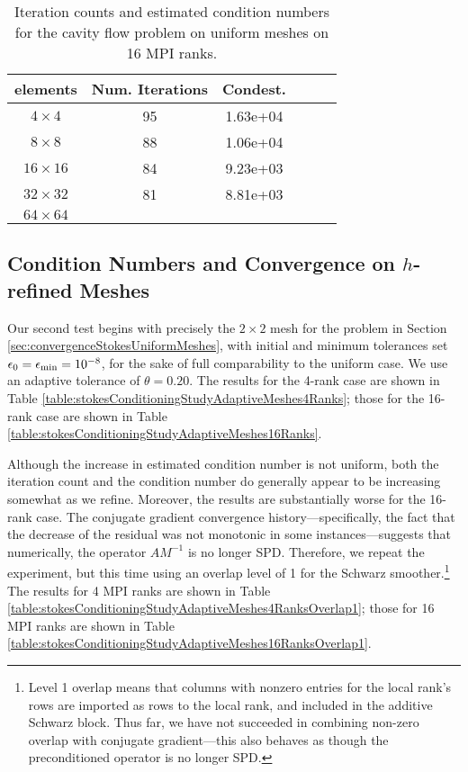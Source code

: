 \documentclass[11pt]{amsart}
\begin{document}
\begin{table}
\begin{tabular}{ c  c  c  c  c  c }
elements	&Num. Iterations	&Condest.\\
\hline
$4 \times 4$	&95	&1.63e+04\\
$8 \times 8$	&88	&1.06e+04\\
$16 \times 16$	&84	&9.23e+03\\
$32 \times 32$	&81	&8.81e+03\\
$64 \times 64$	&	&\\
\end{tabular}
\caption{Iteration counts and estimated condition numbers for the cavity flow problem on uniform meshes on 16 MPI ranks.}
\label{table:stokesConditioningStudyUniformMesh16Ranks}
\end{table}

\subsection{Condition Numbers and Convergence on $h$-refined Meshes}
Our second test begins with precisely the $2 \times 2$ mesh for the problem in Section \ref{sec:convergenceStokesUniformMeshes}, with initial and minimum tolerances set $\epsilon_0 = \epsilon_{\rm min} = 10^{-8}$, for the sake of full comparability to the uniform case.  We use an adaptive tolerance of $\theta=0.20$.  The results for the 4-rank case are shown in Table \ref{table:stokesConditioningStudyAdaptiveMeshes4Ranks}; those for the 16-rank case are shown in Table \ref{table:stokesConditioningStudyAdaptiveMeshes16Ranks}.

Although the increase in estimated condition number is not uniform, both the iteration count and the condition number do generally appear to be increasing somewhat as we refine.  Moreover, the results are substantially worse for the 16-rank case.  The conjugate gradient convergence history---specifically, the fact that the decrease of the residual was not monotonic in some instances---suggests that numerically, the operator $A M^{-1}$ is no longer SPD.  Therefore, we repeat the experiment, but this time using an overlap level of 1 for the Schwarz smoother.\footnote{Level 1 overlap means that columns with nonzero entries for the local rank's rows are imported as rows to the local rank, and included in the additive Schwarz block.  Thus far, we have not succeeded in combining non-zero overlap with conjugate gradient---this also behaves as though the preconditioned operator is no longer SPD.}  The results for 4 MPI ranks are shown in Table \ref{table:stokesConditioningStudyAdaptiveMeshes4RanksOverlap1}; those for 16 MPI ranks are shown in Table \ref{table:stokesConditioningStudyAdaptiveMeshes16RanksOverlap1}.
\end{document}

